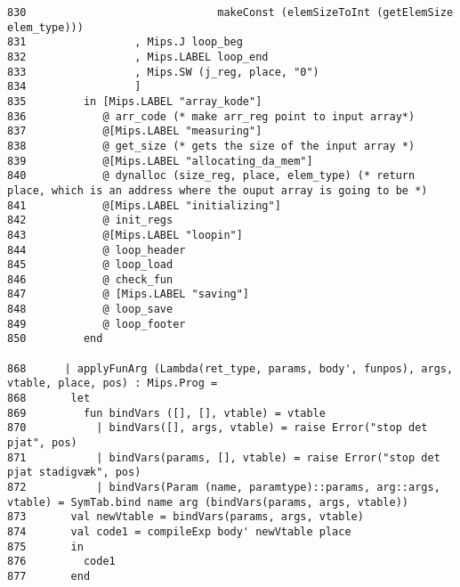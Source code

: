 \documentclass[paper=a4, fontsize=11pt]{scrartcl} %
\numberwithin{equation}{section} %
\numberwithin{figure}{section} %
\numberwithin{table}{section} %
\begin{document}
\begin{lstlisting}
830	                             makeConst (elemSizeToInt (getElemSize elem_type))) 
831	                , Mips.J loop_beg 
832	                , Mips.LABEL loop_end 
833	                , Mips.SW (j_reg, place, "0") 
834	                ] 
835	        in [Mips.LABEL "array_kode"]  
836	           @ arr_code (* make arr_reg point to input array*) 
837	           @[Mips.LABEL "measuring"]  
838	           @ get_size (* gets the size of the input array *) 
839	           @[Mips.LABEL "allocating_da_mem"]  
840	           @ dynalloc (size_reg, place, elem_type) (* return place, which is an address where the ouput array is going to be *) 
841	           @[Mips.LABEL "initializing"]  
842	           @ init_regs 
843	           @[Mips.LABEL "loopin"]  
844	           @ loop_header 
845	           @ loop_load 
846	           @ check_fun 
847	           @ [Mips.LABEL "saving"]  
848	           @ loop_save 
849	           @ loop_footer 
850	        end 

868      | applyFunArg (Lambda(ret_type, params, body', funpos), args, vtable, place, pos) : Mips.Prog =  
868	      let  
869	        fun bindVars ([], [], vtable) = vtable 
870	          | bindVars([], args, vtable) = raise Error("stop det pjat", pos) 
871	          | bindVars(params, [], vtable) = raise Error("stop det pjat stadigvæk", pos) 
872	          | bindVars(Param (name, paramtype)::params, arg::args, vtable) = SymTab.bind name arg (bindVars(params, args, vtable)) 
873	      val newVtable = bindVars(params, args, vtable) 
874	      val code1 = compileExp body' newVtable place 
875	      in 
876	        code1 
877	      end 
\end{lstlisting}

\pagebreak
\end{document}
